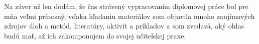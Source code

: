 Na záver už len dodám, že čas strávený vypracovaním diplomovej práce bol pre mňa veľmi prínosný, vďaka hľadaniu materiálov som objavila mnoho zaujímavých zdrojov úloh a metód, literatúry, aktivít a príkladov a som zvedavá, aký ohlas budú mať, až ich zakomponujem do svojej učiteľskej praxe.


\renewcommand{\bibname}{Zoznam použitej literatúry}
\HlavickaLiteratura
\printbibliography[heading=bibintoc]


